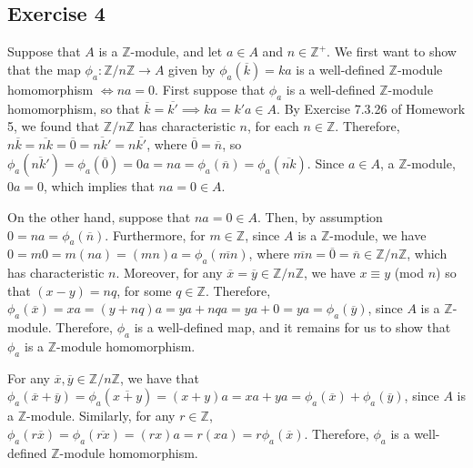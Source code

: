 \subsection*{Exercise 4}
Suppose that $A$ is a $\mathbb{Z}$-module, and let $a \in A$ and $n \in \mathbb{Z}^+$. We first want to show that the map $\phi_a: \mathbb{Z}/n\mathbb{Z} \rightarrow A$ given by $\phi_a(\overline{k}) = ka$ is a well-defined $\mathbb{Z}$-module homomorphism $\iff na = 0$. First suppose that $\phi_a$ is a well-defined $\mathbb{Z}$-module homomorphism, so that $\overline{k} = \overline{k'} \implies ka = k'a \in A$. By Exercise 7.3.26 of Homework 5, we found that $\mathbb{Z}/n\mathbb{Z}$ has characteristic $n$, for each $n \in \mathbb{Z}$. Therefore, $n\overline{k} = \overline{nk} = \overline{0} = \overline{nk'} = n\overline{k'}$, where $\overline{0} = \overline{n}$, so $\phi_a(\overline{nk'}) = \phi_a(\overline{0}) = 0a = na = \phi_a(\overline{n}) = \phi_a(\overline{nk})$. Since $a \in A$, a $\mathbb{Z}$-module, $0a = 0$, which implies that $na = 0 \in A$.

On the other hand, suppose that $na = 0 \in A$. Then, by assumption $0 = na = \phi_a(\overline{n})$. Furthermore, for $m \in \mathbb{Z}$, since $A$ is a $\mathbb{Z}$-module, we have $0 = m0 = m(na) = (mn)a = \phi_a(\overline{mn})$, where $\overline{mn} = \overline{0} = \overline{n} \in \mathbb{Z}/n\mathbb{Z}$, which has characteristic $n$. Moreover, for any $\overline{x} = \overline{y} \in \mathbb{Z}/n\mathbb{Z}$, we have $x \equiv y$ (mod $n$) so that $(x-y) = nq$, for some $q \in \mathbb{Z}$. Therefore, $\phi_a(\overline{x}) = xa = (y + nq)a = ya + nqa = ya + 0 = ya = \phi_a(\overline{y})$, since $A$ is a $\mathbb{Z}$-module. Therefore, $\phi_a$ is a well-defined map, and it remains for us to show that $\phi_a$ is a $\mathbb{Z}$-module homomorphism. 

For any $\overline{x}, \overline{y} \in \mathbb{Z}/n\mathbb{Z}$, we have that $\phi_a(\overline{x}+\overline{y}) = \phi_a(\overline{x+y}) = (x+y)a = xa + ya = \phi_a(\overline{x}) + \phi_a(\overline{y})$, since $A$ is a $\mathbb{Z}$-module. Similarly, for any $r \in \mathbb{Z}$, $\phi_a(r\overline{x}) = \phi_a(\overline{rx}) = (rx)a = r(xa) = r\phi_a(\overline{x})$. Therefore, $\phi_a$ is a well-defined $\mathbb{Z}$-module homomorphism.

